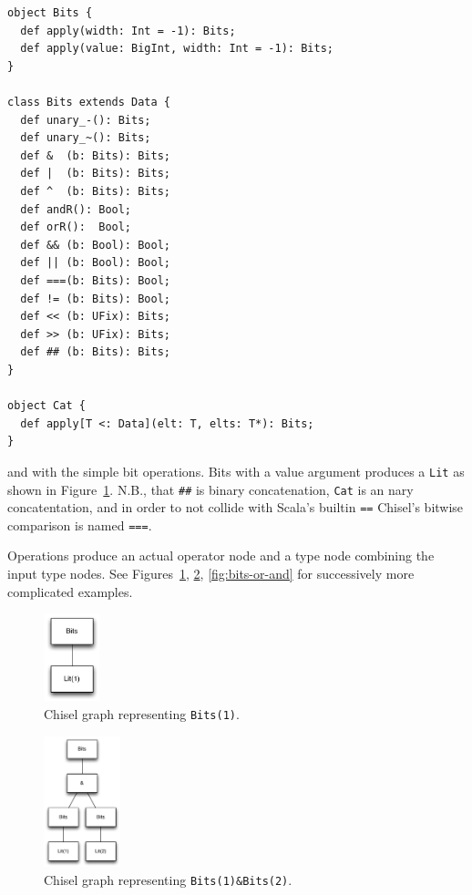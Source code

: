 \documentclass[10pt,twocolumn]{article}
\def\code#1{{\small\tt #1}}
\begin{document}
\begin{lstlisting}
object Bits {
  def apply(width: Int = -1): Bits;
  def apply(value: BigInt, width: Int = -1): Bits;
}

class Bits extends Data {
  def unary_-(): Bits;
  def unary_~(): Bits;
  def &  (b: Bits): Bits;
  def |  (b: Bits): Bits;
  def ^  (b: Bits): Bits;
  def andR(): Bool;
  def orR():  Bool;
  def && (b: Bool): Bool;
  def || (b: Bool): Bool;
  def ===(b: Bits): Bool;
  def != (b: Bits): Bool;
  def << (b: UFix): Bits;
  def >> (b: UFix): Bits;
  def ## (b: Bits): Bits;
}

object Cat {
  def apply[T <: Data](elt: T, elts: T*): Bits;
}
\end{lstlisting}

\noindent
and with the simple bit operations.  
Bits with a value argument produces a \code{Lit} as shown in Figure~\ref{fig:bits-1}.
N.B., that \code{\#\#} is binary
concatenation, \code{Cat} is an nary concatentation,
and in order to not collide with Scala's builtin \code{==}
Chisel's bitwise comparison is named \code{===}.

Operations produce an actual operator node and a type node combining the input type nodes.
See Figures~\ref{fig:bits-1}, \ref{fig:bits-and}, \ref{fig:bits-or-and} for
successively more complicated examples.

\begin{figure}[h]
\centering
\includegraphics[height=1in]{figs/bits-1.pdf}
\caption{Chisel graph representing {\tt\footnotesize Bits(1)}.}
\label{fig:bits-1}
\end{figure}

\begin{figure}[h]
\centering
\includegraphics[height=1.5in]{figs/bits-and.pdf}
\caption{Chisel graph representing {\tt\footnotesize Bits(1)\&Bits(2)}.}
\label{fig:bits-and}
\end{figure}
\end{document}
